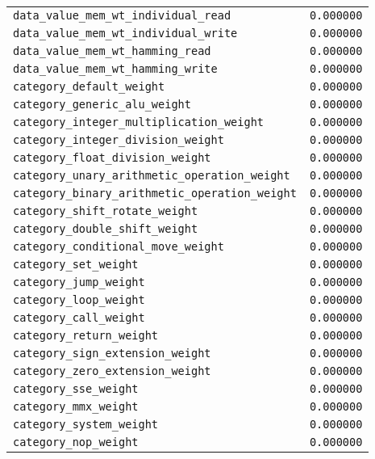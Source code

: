 \clearpage

\begin{tabular}{lc}
  \texttt{data\_value\_mem\_wt\_individual\_read} & \texttt{0.000000} \\
  \texttt{data\_value\_mem\_wt\_individual\_write} & \texttt{0.000000} \\
  \texttt{data\_value\_mem\_wt\_hamming\_read} & \texttt{0.000000} \\
  \texttt{data\_value\_mem\_wt\_hamming\_write} & \texttt{0.000000} \\
  \texttt{category\_default\_weight} & \texttt{0.000000} \\
  \texttt{category\_generic\_alu\_weight} & \texttt{0.000000} \\
  \texttt{category\_integer\_multiplication\_weight} & \texttt{0.000000} \\
  \texttt{category\_integer\_division\_weight} & \texttt{0.000000} \\
  \texttt{category\_float\_division\_weight} & \texttt{0.000000} \\
  \texttt{category\_unary\_arithmetic\_operation\_weight} & \texttt{0.000000} \\
  \texttt{category\_binary\_arithmetic\_operation\_weight} & \texttt{0.000000} \\
  \texttt{category\_shift\_rotate\_weight} & \texttt{0.000000} \\
  \texttt{category\_double\_shift\_weight} & \texttt{0.000000} \\
  \texttt{category\_conditional\_move\_weight} & \texttt{0.000000} \\
  \texttt{category\_set\_weight} & \texttt{0.000000} \\
  \texttt{category\_jump\_weight} & \texttt{0.000000} \\
  \texttt{category\_loop\_weight} & \texttt{0.000000} \\
  \texttt{category\_call\_weight} & \texttt{0.000000} \\
  \texttt{category\_return\_weight} & \texttt{0.000000} \\
  \texttt{category\_sign\_extension\_weight} & \texttt{0.000000} \\
  \texttt{category\_zero\_extension\_weight} & \texttt{0.000000} \\
  \texttt{category\_sse\_weight} & \texttt{0.000000} \\
  \texttt{category\_mmx\_weight} & \texttt{0.000000} \\
  \texttt{category\_system\_weight} & \texttt{0.000000} \\
  \texttt{category\_nop\_weight} & \texttt{0.000000}
\end{tabular}

